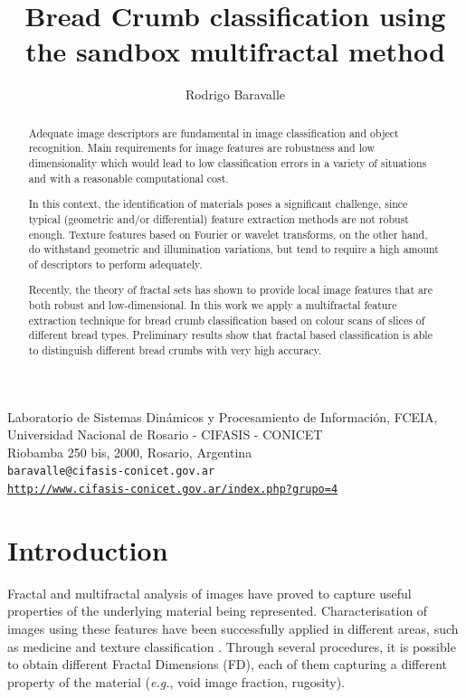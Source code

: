 \documentclass[oneside,a4paper,english,links]{article}
\title{Bread Crumb classification using the sandbox multifractal method}
\author{Rodrigo Baravalle}
\begin{document}
\maketitle
\begin{center}
\small{Laboratorio de Sistemas Din\'amicos y Procesamiento de Informaci\'on, FCEIA, Universidad Nacional de Rosario - CIFASIS - CONICET}\\
\small{Riobamba 250 bis, 2000, Rosario, Argentina}\\

\texttt{baravalle@cifasis-conicet.gov.ar}\\
\texttt{\url{http://www.cifasis-conicet.gov.ar/index.php?grupo=4}}
\end{center}

\begin{abstract}
Adequate image descriptors are fundamental in image classification and object recognition. Main requirements for image features are robustness and low dimensionality which would lead to low classification errors in a variety of situations and with a reasonable computational cost.

In this context, the identification of materials poses a significant challenge, since typical (geometric and/or differential) feature extraction methods are not robust enough. Texture features based on Fourier or wavelet transforms, on the other hand, do withstand geometric and illumination variations, but tend to require a high amount of descriptors to perform adequately. 

Recently, the theory of fractal sets has shown to provide local image features that are both robust and low-dimensional. In this work we apply a multifractal feature extraction technique for bread crumb classification based on colour scans of slices of different bread types. Preliminary results show that fractal based classification is able to distinguish different bread crumbs with very high accuracy.
\end{abstract}

\section{Introduction}
Fractal and multifractal analysis of images have proved to capture useful properties of the underlying material being represented. Characterisation of images using these features have been successfully applied in different areas, such as medicine \cite{Andjelkovic2008,Yu2011} and texture classification \cite{Wendt2009}. Through several procedures, it is possible to obtain different Fractal Dimensions (FD), each of them capturing a different property of the material ({\em e.g.}, void image fraction, rugosity).
\end{document}

